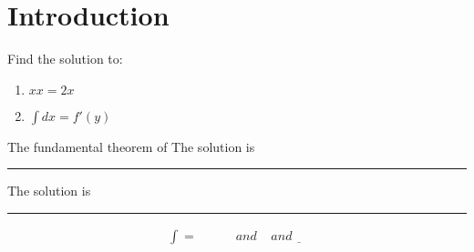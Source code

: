 \documentclass{lecturenotes}
\begin{document}
\section{Introduction}
\begin{example}
Find the solution to: 
\begin{enumerate}
    \item $xx = 2x$
    \item $\int dx = f'(y)$
\end{enumerate}
\end{example}



\begin{theorem}
The fundamental theorem of 
The solution is \rule{4em}{0.1em} 
\end{theorem}


The solution is \rule{4em}{0.1em} 


\begin{align*}
\int =\quad\quad\quad and \mspace{20mu} and \underline{\mspace{20mu}}  
\end{align*}
\end{document}
